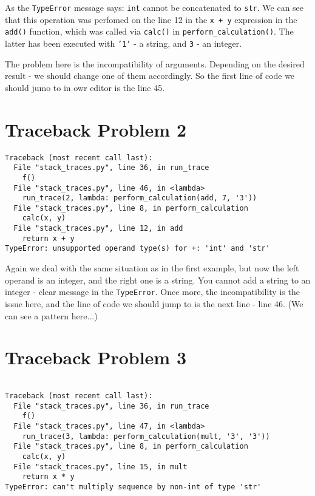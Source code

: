 \documentclass[8pt, a4paper]{article}
\begin{document}
As the \texttt{TypeError} message says: \texttt{int} cannot be concatenated to \texttt{str}. We can see that this operation was perfomed on the line 12 in the \texttt{x + y} expression in the \texttt{add()} function, which was called via \texttt{calc()} in \texttt{perform_calculation()}.
The latter has been executed with \texttt{'1'} - a string, and \texttt{3} - an integer.

The problem here is the incompatibility of arguments. Depending on the desired result - we should change one of them accordingly. So the first line of code we should jumo to in owr editor is the line 45.

\section*{Traceback Problem 2}
\begin{verbatim}
Traceback (most recent call last):
  File "stack_traces.py", line 36, in run_trace
    f()
  File "stack_traces.py", line 46, in <lambda>
    run_trace(2, lambda: perform_calculation(add, 7, '3'))
  File "stack_traces.py", line 8, in perform_calculation
    calc(x, y)
  File "stack_traces.py", line 12, in add
    return x + y
TypeError: unsupported operand type(s) for +: 'int' and 'str'
\end{verbatim}

Again we deal with the same situation as in the first example, but now the left operand is an integer, and the right one is a string.  You cannot add a string to an integer - clear message in the \texttt{TypeError}. Once more, the incompatibility is the issue here, and the line of code we should jump to is the next line - line 46. (We can see a pattern here...)

\section*{Traceback Problem 3}
\begin{verbatim}

Traceback (most recent call last):
  File "stack_traces.py", line 36, in run_trace
    f()
  File "stack_traces.py", line 47, in <lambda>
    run_trace(3, lambda: perform_calculation(mult, '3', '3'))
  File "stack_traces.py", line 8, in perform_calculation
    calc(x, y)
  File "stack_traces.py", line 15, in mult
    return x * y
TypeError: can't multiply sequence by non-int of type 'str'
\end{verbatim}
\end{document}
